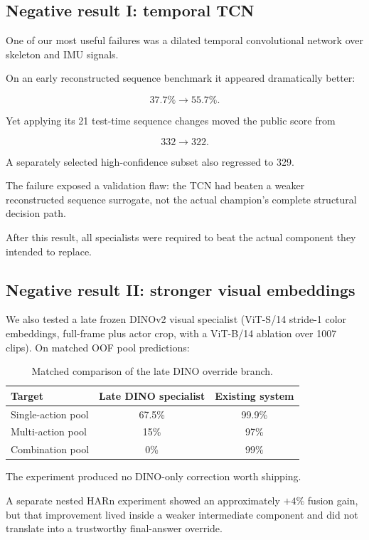 \documentclass[12pt,a4paper]{article}
\begin{document}
\subsection{Negative result I: temporal TCN}

One of our most useful failures was a dilated temporal convolutional network
over skeleton and IMU signals.

On an early reconstructed sequence benchmark it appeared dramatically better:

\[
37.7\%
\rightarrow
55.7\%.
\]

Yet applying its 21 test-time sequence changes moved the public score from

\[
332
\rightarrow
322.
\]

A separately selected high-confidence subset also regressed to 329.

The failure exposed a validation flaw: the TCN had beaten a weaker reconstructed
sequence surrogate, not the actual champion's complete structural decision
path.

After this result, all specialists were required to beat the actual component
they intended to replace.

\subsection{Negative result II: stronger visual embeddings}

We also tested a late frozen DINOv2 visual specialist (ViT-S/14 stride-1
color embeddings, full-frame plus actor crop, with a ViT-B/14 ablation over
1007 clips). On matched OOF pool predictions:

\begin{table}[ht]
\centering
\small
\begin{tabular}{lcc}
\toprule
\textbf{Target} & \textbf{Late DINO specialist} & \textbf{Existing system} \\
\midrule
Single-action pool & 67.5\% & 99.9\% \\
Multi-action pool & 15\% & 97\% \\
Combination pool & 0\% & 99\% \\
\bottomrule
\end{tabular}
\caption{Matched comparison of the late DINO override branch.}
\end{table}

The experiment produced no DINO-only correction worth shipping.

A separate nested HARn experiment showed an approximately \(+4\%\) fusion gain,
but that improvement lived inside a weaker intermediate component and did not
translate into a trustworthy final-answer override.
\end{document}
